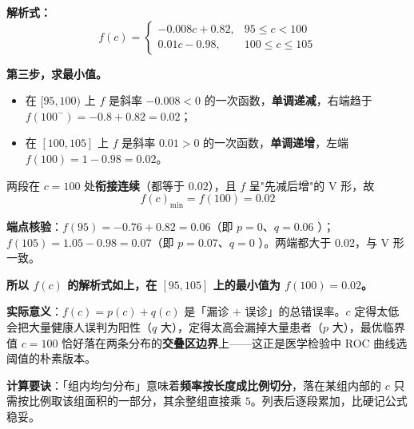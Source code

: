 \begin{answer}
\textbf{解析式：}
\nopagebreak[4]
\[f(c)=\begin{cases}-0.008c+0.82,&95\le c<100\\ 0.01c-0.98,&100\le c\le105\end{cases}\]

\textbf{第三步，求最小值。}

\begin{itemize}
\item 在 $[95,100)$ 上 $f$ 是斜率 $-0.008<0$ 的一次函数，\textbf{单调递减}，右端趋于 $f(100^{-})=-0.8+0.82=0.02$；
\item 在 $[100,105]$ 上 $f$ 是斜率 $0.01>0$ 的一次函数，\textbf{单调递增}，左端 $f(100)=1-0.98=0.02$。
\end{itemize}

两段在 $c=100$ 处\textbf{衔接连续}（都等于 $0.02$），且 $f$ 呈"先减后增"的 V 形，故
\nopagebreak[4]
\[f(c)_{\min}=f(100)=0.02\]

\textbf{端点核验}：$f(95)=-0.76+0.82=0.06$（即 $p=0$、$q=0.06$ ）；$f(105)=1.05-0.98=0.07$（即 $p=0.07$、$q=0$ ）。两端都大于 $0.02$，与 V 形一致。

\textbf{所以 $f(c)$ 的解析式如上，在 $[95,105]$ 上的最小值为 $f(100)=0.02$。}

\begin{gktip}
\textbf{实际意义}：$f(c)=p(c)+q(c)$ 是「漏诊 $+$ 误诊」的总错误率。$c$ 定得太低会把大量健康人误判为阳性（$q$ 大），定得太高会漏掉大量患者（$p$ 大），最优临界值 $c=100$ 恰好落在两条分布的\textbf{交叠区边界}上——这正是医学检验中 ROC 曲线选阈值的朴素版本。

\textbf{计算要诀}：「组内均匀分布」意味着\textbf{频率按长度成比例切分}，落在某组内部的 $c$ 只需按比例取该组面积的一部分，其余整组直接乘 $5$。列表后逐段累加，比硬记公式稳妥。
\end{gktip}



\par\medskip

\end{answer}
